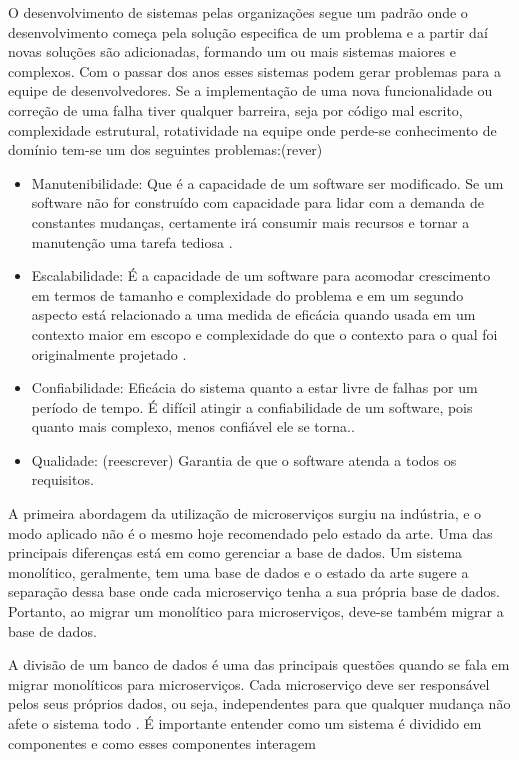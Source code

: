 \documentclass[12pt]{article}
\begin{document}
O desenvolvimento de sistemas pelas organizações segue um padrão onde o desenvolvimento começa pela solução especifica de um problema e a partir daí novas soluções são adicionadas, formando um ou mais sistemas maiores e complexos. Com o passar dos anos esses sistemas podem gerar problemas para a equipe de desenvolvedores. Se a implementação de uma nova funcionalidade ou correção de uma falha tiver qualquer barreira, seja por código mal escrito, complexidade estrutural, rotatividade na equipe onde perde-se conhecimento de domínio tem-se um dos seguintes problemas:(rever)
\begin{itemize}
	\item Manutenibilidade: Que é a capacidade de um software ser modificado. Se um software não for construído com capacidade para lidar com a demanda de constantes mudanças, certamente irá consumir mais recursos e tornar a manutenção uma tarefa tediosa \cite{Velmourougan2014}.
	\item Escalabilidade: É a capacidade de um software para acomodar crescimento em termos de tamanho e complexidade do problema e em um segundo aspecto está relacionado a uma medida de eficácia quando usada em um contexto maior em escopo e complexidade do que o contexto para o qual foi originalmente projetado \cite{Ibrahim2009}.
	\item Confiabilidade: Eficácia do sistema quanto a estar livre de falhas por um período de tempo. É difícil atingir a confiabilidade de um software, pois quanto mais complexo, menos confiável ele se torna.\cite{pan1999}.
	\item Qualidade: (reescrever) Garantia de que o software atenda a todos os requisitos.
\end{itemize}

A primeira abordagem da utilização de microserviços surgiu na indústria, e o modo aplicado não é o mesmo hoje recomendado pelo estado da arte. Uma das principais diferenças está em como gerenciar a base de dados. Um sistema monolítico, geralmente, tem uma base de dados e o estado da arte sugere a separação dessa base onde cada microserviço tenha a sua própria base de dados. Portanto, ao migrar um monolítico para microserviços, deve-se também migrar a base de dados.

A divisão de um banco de dados é uma das principais questões quando se fala em migrar monolíticos para microserviços. Cada microserviço deve ser responsável pelos seus próprios dados, ou seja, independentes para que qualquer mudança não afete o sistema todo \cite{Kholy2019}. É importante entender como um sistema é dividido em componentes e como esses componentes interagem
\end{document}

